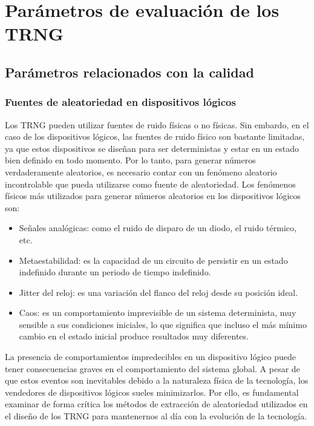     \section{Parámetros de evaluación de los TRNG}
        
        \subsection{Parámetros relacionados con la calidad}	

            \subsubsection{Fuentes de aleatoriedad en dispositivos lógicos} 

            Los TRNG pueden utilizar fuentes de ruido físicas o no físicas. Sin embardo, en el caso de los dispositivos lógicos, las fuentes de ruido físico son bastante limitadas, ya que estos dispositivos se diseñan para ser deterministas y estar en un estado bien definido en todo momento. Por lo tanto, para generar números verdaderamente aleatorios, es necesario contar con un fenómeno aleatorio incontrolable que pueda utilizarse como fuente de aleatoriedad. Los fenómenos físicos más utilizados para generar números aleatorios en los dispositivos lógicos son:
	
            \begin{itemize}[noitemsep]
                \item Señales analógicas: como el ruido de disparo de un diodo, el ruido térmico, etc.		

                \item Metaestabilidad: es la capacidad de un circuito de persistir en un estado indefinido durante un periodo de tiempo indefinido.
                
                \item Jitter del reloj: es una variación del flanco del reloj desde su posición ideal.
                
                \item Caos: es un comportamiento imprevisible de un sistema determinista, muy sensible a sus condiciones iniciales, lo que significa que incluso el más mínimo cambio en el estado inicial produce resultados muy diferentes.
            \end{itemize}		
	
            La presencia de comportamientos impredecibles en un dispositivo lógico puede tener consecuencias graves en el comportamiento del sistema global. A pesar de que estos eventos son inevitables debido a la naturaleza física de la tecnología, los vendedores de dispositivos lógicos sueles minimizarlos. Por ello, es fundamental examinar de forma crítica los métodos de extracción de aleatoriedad utilizados en el diseño de los TRNG para mantenernos al día con la evolución de la tecnología.

